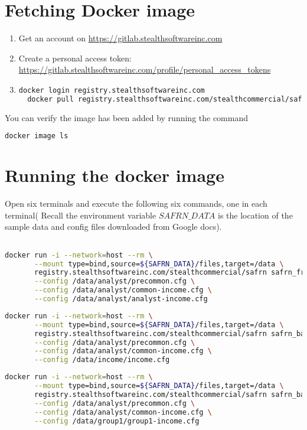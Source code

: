 \documentclass[12pt]{article}
\begin{document}
\section{Fetching Docker image}

\begin{enumerate}
\item Get an account on \url{https://gitlab.stealthsoftwareinc.com}
\item Create a personal access token: \url{https://gitlab.stealthsoftwareinc.com/profile/personal_access_tokens}

\item \begin{lstlisting}[language=sh]
  docker login registry.stealthsoftwareinc.com
  docker pull registry.stealthsoftwareinc.com/stealthcommercial/safrn
\end{lstlisting}
\end{enumerate}

You can verify the image has been added by running the
command

\begin{lstlisting}[language=sh]
  docker image ls
\end{lstlisting}


\section{Running the docker image}

Open six terminals and execute the following six commands, one in each
terminal( Recall the environment variable $SAFRN\_DATA$ is the location
of the sample data and config files downloaded from Google docs).

\begin{lstlisting}[language=sh]

docker run -i --network=host --rm \
       --mount type=bind,source=${SAFRN_DATA}/files,target=/data \
       registry.stealthsoftwareinc.com/stealthcommercial/safrn safrn_front_server \
       --config /data/analyst/precommon.cfg \
       --config /data/analyst/common-income.cfg \
       --config /data/analyst/analyst-income.cfg
\end{lstlisting}

\begin{lstlisting}[language=sh]
docker run -i --network=host --rm \
       --mount type=bind,source=${SAFRN_DATA}/files,target=/data \
       registry.stealthsoftwareinc.com/stealthcommercial/safrn safrn_back_server \
       --config /data/analyst/precommon.cfg \
       --config /data/analyst/common-income.cfg \
       --config /data/income/income.cfg
\end{lstlisting}
\begin{lstlisting}[language=sh]
docker run -i --network=host --rm \
       --mount type=bind,source=${SAFRN_DATA}/files,target=/data \
       registry.stealthsoftwareinc.com/stealthcommercial/safrn safrn_back_server \
       --config /data/analyst/precommon.cfg \
       --config /data/analyst/common-income.cfg \
       --config /data/group1/group1-income.cfg
\end{lstlisting}
\end{document}
